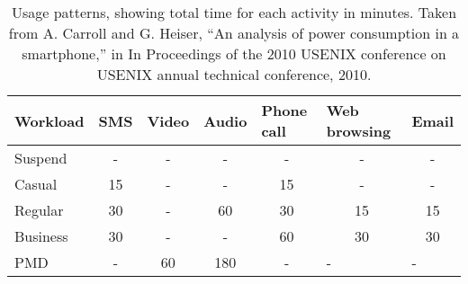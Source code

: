 \documentclass[conference]{IEEEtran}
\begin{document}
\begin{table}[h]
\begin{tabular}{|l|c|c|c|c|c|c|}
\hline
Workload & \multicolumn{1}{l|}{SMS} & \multicolumn{1}{l|}{Video} & \multicolumn{1}{l|}{Audio} & \multicolumn{1}{l|}{Phone call} & \multicolumn{1}{l|}{Web browsing} & \multicolumn{1}{l|}{Email} \\ \hline
Suspend  & -                        & -                          & -                          & -                               & -                                 & -                          \\ \hline
Casual   & 15                       & -                          & -                          & 15                              & -                                 & -                          \\ \hline
Regular  & 30                       & -                          & 60                         & 30                              & 15                                & 15                         \\ \hline
Business & 30                       & -                          & -                          & 60                              & 30                                & 30                         \\ \hline
PMD      & -                        & 60                         & 180                        & -                               & \multicolumn{1}{l|}{-}            & \multicolumn{1}{l|}{-}     \\ \hline
\end{tabular}
\caption {Usage patterns, showing total time for each activity in minutes. Taken from  A. Carroll and G. Heiser, “An analysis of power consumption in a smartphone,” in In Proceedings of the 2010 USENIX conference on USENIX annual technical conference, 2010.}
\end{table}
  
\end{document}
